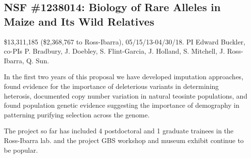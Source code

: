 \subsection*{NSF \#1238014: Biology of Rare Alleles in Maize and Its Wild Relatives} 
\$13,311,185 (\$2,368,767 to Ross-Ibarra), 05/15/13-04/30/18. PI Edward Buckler, co-PIs P. Bradbury, J. Doebley,  S. Flint-Garcia, J. Holland,  S. Mitchell, J. Ross-Ibarra, Q. Sun.
\par{} In the first two years of this proposal we have developed imputation approaches, found evidence for the importance of deleterious variants in determining heterosis, documented copy number variation in natural teosinte populations, and found population genetic evidence suggesting the importance of demography in patterning purifying selection across the genome. 
\par{} The project so far has included 4 postdoctoral and 1 graduate trainees in the Ross-Ibarra lab. and the project GBS workshop and museum exhibit continue to be popular. 
\par{} \citet{tiffin2014advances, Takuno15062015, da2015origin, hake2015genetic, makarevitch2015transposable} 

